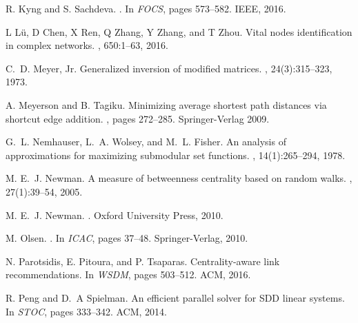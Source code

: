 \documentclass{article}
\begin{document}
\begin{thebibliography}{}
R. Kyng and S. Sachdeva.
.
\newblock In {\em FOCS}, pages 573--582. IEEE, 2016.

L L{\"u}, D Chen, X Ren, Q Zhang, Y Zhang,
  and T Zhou.
\newblock Vital nodes identification in complex networks.
, 650:1--63, 2016.

C.~D. Meyer, Jr.
\newblock Generalized inversion of modified matrices.
, 24(3):315--323, 1973.

A. Meyerson and B. Tagiku.
\newblock Minimizing average shortest path distances via shortcut edge
  addition.
, pages 272--285. Springer-Verlag 2009.

G.~L. Nemhauser, L.~A. Wolsey, and M.~L. Fisher.
\newblock An analysis of approximations for maximizing submodular set
  functions.
, 14(1):265--294, 1978.

M. E.~J. Newman.
\newblock A measure of betweenness centrality based on random walks.
, 27(1):39--54, 2005.

M. E.~J. Newman.
.
\newblock Oxford University Press, 2010.

M. Olsen.
.
\newblock In {\em ICAC}, pages 37--48. Springer-Verlag, 2010.

N. Parotsidis, E. Pitoura, and P. Tsaparas.
\newblock Centrality-aware link recommendations.
\newblock In {\em WSDM}, pages 503--512. ACM, 2016.

R. Peng and D.~A Spielman.
\newblock An efficient parallel solver for {SDD} linear systems.
\newblock In {\em STOC}, pages 333--342. ACM, 2014.


\end{thebibliography}
\end{document}
